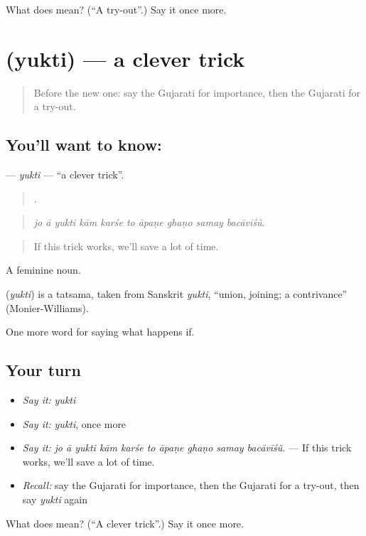 \begin{tcolorbox}[breakable,colback=teal!4,colframe=teal!35!black,title={Before you move on}]
What does  mean? (\textquotedblleft{}A try-out\textquotedblright{}.) Say it once more.
\end{tcolorbox}
\section[\texorpdfstring{\gu{યુક્તિ} (yukti)}{યુક્તિ (yukti)}]{ (yukti) — a clever trick}

\label{lesson:GU-C545-yukti}



\begin{quote}
Before the new one: say the Gujarati for importance, then the Gujarati for a try-out.
\end{quote}

\subsection*{You'll want to know: }
\textbf{} — \emph{yukti} — \textquotedblleft{}a clever trick\textquotedblright{}.

\begin{quote}
         .
\end{quote}

\begin{quote}
\emph{jo ā yukti kām karśe to āpaṇe ghaṇo samay bacāvīśũ.}
\end{quote}

\begin{quote}
If this trick works, we'll save a lot of time.
\end{quote}

A feminine noun.

\begin{cousinweb}
\textbf{} (\emph{yukti}) is a tatsama, taken from Sanskrit \emph{yukti}, \textquotedblleft{}union, joining; a contrivance\textquotedblright{} (Monier-Williams).
\end{cousinweb}

\begin{grammarlens}[title={What you've built}]
One more word for saying what happens if.
\end{grammarlens}

\subsection*{Your turn}
\begin{itemize}
\raggedright
  \item \emph{Say it:} \emph{yukti}
  \item \emph{Say it:} \emph{yukti}, once more
  \item \emph{Say it:} \emph{jo ā yukti kām karśe to āpaṇe ghaṇo samay bacāvīśũ.} — If this trick works, we'll save a lot of time.
  \item \emph{Recall:} say the Gujarati for importance, then the Gujarati for a try-out, then say \emph{yukti} again
\end{itemize}

\begin{tcolorbox}[breakable,colback=teal!4,colframe=teal!35!black,title={Before you move on}]
What does  mean? (\textquotedblleft{}A clever trick\textquotedblright{}.) Say it once more.
\end{tcolorbox}
